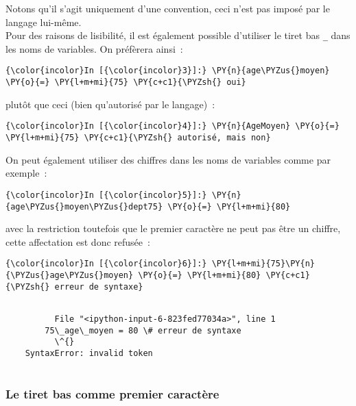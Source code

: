 Notons qu'il s'agit uniquement d'une convention, ceci n'est pas imposé
par le langage lui-même.\\

    Pour des raisons de lisibilité, il est également possible d'utiliser le
tiret bas \texttt{\_} dans les noms de variables. On préfèrera ainsi~:

    \begin{Verbatim}[commandchars=\\\{\}]
{\color{incolor}In [{\color{incolor}3}]:} \PY{n}{age\PYZus{}moyen} \PY{o}{=} \PY{l+m+mi}{75} \PY{c+c1}{\PYZsh{} oui}
\end{Verbatim}


    plutôt que ceci (bien qu'autorisé par le langage)~:

    \begin{Verbatim}[commandchars=\\\{\}]
{\color{incolor}In [{\color{incolor}4}]:} \PY{n}{AgeMoyen} \PY{o}{=} \PY{l+m+mi}{75} \PY{c+c1}{\PYZsh{} autorisé, mais non}
\end{Verbatim}


    On peut également utiliser des chiffres dans les noms de variables comme
par exemple~:

    \begin{Verbatim}[commandchars=\\\{\}]
{\color{incolor}In [{\color{incolor}5}]:} \PY{n}{age\PYZus{}moyen\PYZus{}dept75} \PY{o}{=} \PY{l+m+mi}{80}
\end{Verbatim}


    avec la restriction toutefois que le premier caractère ne peut pas être
un chiffre, cette affectation est donc refusée~:

    \begin{Verbatim}[commandchars=\\\{\}]
{\color{incolor}In [{\color{incolor}6}]:} \PY{l+m+mi}{75}\PY{n}{\PYZus{}age\PYZus{}moyen} \PY{o}{=} \PY{l+m+mi}{80} \PY{c+c1}{\PYZsh{} erreur de syntaxe}
\end{Verbatim}


    \begin{Verbatim}[commandchars=\\\{\}]

          File "<ipython-input-6-823fed77034a>", line 1
        75\_age\_moyen = 80 \# erreur de syntaxe
          \^{}
    SyntaxError: invalid token


    \end{Verbatim}

    \hypertarget{le-tiret-bas-comme-premier-caractuxe8re}{%
\subsubsection{Le tiret bas comme premier
caractère}\label{le-tiret-bas-comme-premier-caractuxe8re}}

